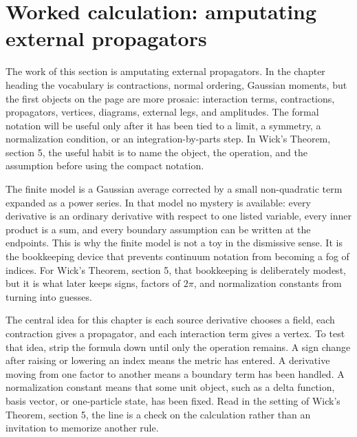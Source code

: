 \section{Worked calculation: amputating external propagators}













The work of this section is amputating external propagators.  In the chapter heading the vocabulary is contractions, normal ordering, Gaussian moments, but the first objects on the page are more prosaic: interaction terms, contractions, propagators, vertices, diagrams, external legs, and amplitudes.  The formal notation will be useful only after it has been tied to a limit, a symmetry, a normalization condition, or an integration-by-parts step.  In Wick's Theorem, section 5, the useful habit is to name the object, the operation, and the assumption before using the compact notation.

The finite model is a Gaussian average corrected by a small non-quadratic term expanded as a power series.  In that model no mystery is available: every derivative is an ordinary derivative with respect to one listed variable, every inner product is a sum, and every boundary assumption can be written at the endpoints.  This is why the finite model is not a toy in the dismissive sense.  It is the bookkeeping device that prevents continuum notation from becoming a fog of indices.  For Wick's Theorem, section 5, that bookkeeping is deliberately modest, but it is what later keeps signs, factors of \(2\pi\), and normalization constants from turning into guesses.

The central idea for this chapter is each source derivative chooses a field, each contraction gives a propagator, and each interaction term gives a vertex.  To test that idea, strip the formula down until only the operation remains.  A sign change after raising or lowering an index means the metric has entered.  A derivative moving from one factor to another means a boundary term has been handled.  A normalization constant means that some unit object, such as a delta function, basis vector, or one-particle state, has been fixed.  Read in the setting of Wick's Theorem, section 5, the line is a check on the calculation rather than an invitation to memorize another rule.

